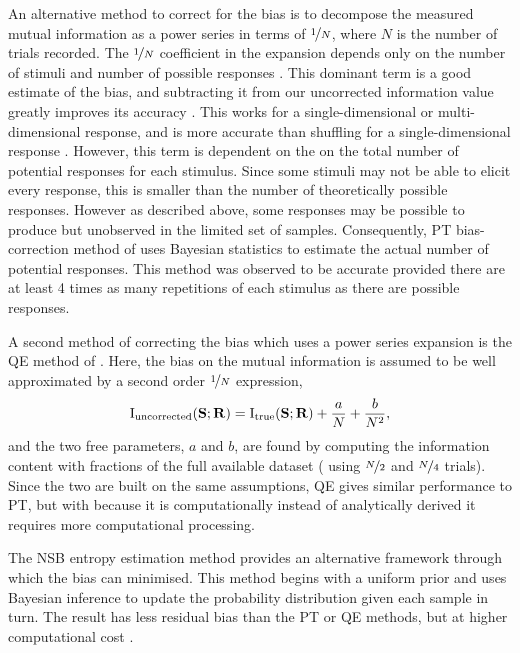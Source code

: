 An alternative method to correct for the bias is to decompose the measured mutual information as a power series in terms of $\nicefrac{1}{N}$, where $N$ is the number of trials recorded.
The $\nicefrac{1}{N}$ coefficient in the expansion depends only on the number of stimuli and number of possible responses \citep{Miller1955,Treves1995}.
This dominant term is a good estimate of the bias, and subtracting it from our uncorrected information value greatly improves its accuracy \citep{Treves1995}.
This works for a single-dimensional or multi-dimensional response, and is more accurate than shuffling for a single-dimensional response \citep{Panzeri1996}.
However, this term is dependent on the on the total number of potential responses for each stimulus.
Since some stimuli may not be able to elicit every response, this is smaller than the number of theoretically possible responses.
However as described above, some responses may be possible to produce but unobserved in the limited set of samples.
Consequently, \ac{PT} bias-correction method of \citet{Panzeri1996} uses Bayesian statistics to estimate the actual number of potential responses.
This method was observed to be accurate provided there are at least 4 times as many repetitions of each stimulus as there are possible responses.

A second method of correcting the bias which uses a power series expansion is the \ac{QE} method of \citet{Strong1998}.
Here, the bias on the mutual information is assumed to be well approximated by a second order $\nicefrac{1}{N}$ expression,
\begin{equation}
\operatorname{I}_{\text{uncorrected}}(\mathbf{S};\mathbf{R}) =
\operatorname{I}_{\text{true}}(\mathbf{S};\mathbf{R}) + \frac{a}{N} + \frac{b}{N^2}
,\end{equation}
and the two free parameters, $a$ and $b$, are found by computing the information content with fractions of the full available dataset (\ie{} using $\nicefrac{N}{2}$ and $\nicefrac{N}{4}$ trials).
Since the two are built on the same assumptions, \ac{QE} gives similar performance to \ac{PT}, but with because it is computationally instead of analytically derived it requires more computational processing.


The \ac{NSB} entropy estimation method \citep{Nemenman2004} provides an alternative framework through which the bias can minimised.
This method begins with a uniform prior and uses Bayesian inference to update the probability distribution given each sample in turn.
The result has less residual bias than the \ac{PT} or \ac{QE} methods, but at higher computational cost \citep{Panzeri2007}.


